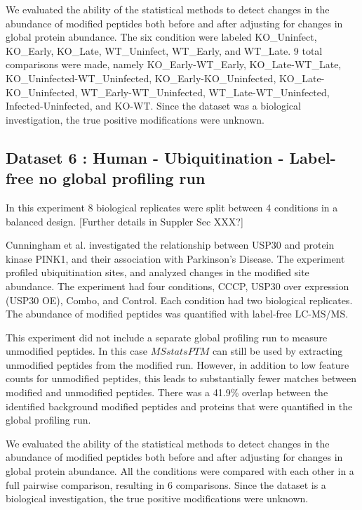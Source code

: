 \documentclass[mcp]{article}
\numberwithin{table}{section}
\def\todo#1{{\color{red}[#1]}}
\begin{document}
\medskip {} We evaluated the ability of the statistical methods to detect changes in the abundance of modified peptides both before and after adjusting for changes in global protein abundance. The six condition were labeled KO\_Uninfect, KO\_Early, KO\_Late, WT\_Uninfect, WT\_Early, and WT\_Late. 9 total comparisons were made, namely KO\_Early-WT\_Early, KO\_Late-WT\_Late, KO\_Uninfected-WT\_Uninfected, KO\_Early-KO\_Uninfected, KO\_Late-KO\_Uninfected, WT\_Early-WT\_Uninfected, WT\_Late-WT\_Uninfected, Infected-Uninfected, and KO-WT. Since the dataset was a biological investigation, the true positive modifications were unknown.


\subsection*{Dataset 6 : Human - Ubiquitination - Label-free no global profiling run}
\label{sec:exp_proc_dataset6}

In this experiment 8 biological replicates were split between 4 conditions in a balanced design. \todo{Further details in Suppler Sec XXX?}
 
\medskip {} Cunningham et al. \cite{Cunningham2015} investigated the relationship between USP30 and protein kinase PINK1, and their association with Parkinson’s Disease. The experiment profiled ubiquitination sites, and analyzed changes in the modified site abundance. The experiment had four conditions, CCCP, USP30 over expression (USP30 OE), Combo, and Control. Each condition had two biological replicates. The abundance of modified peptides was quantified with label-free LC-MS/MS.

\medskip {} This experiment did not include a separate global profiling run to measure unmodified peptides. In this case $MSstatsPTM$ can still be used by extracting unmodified peptides from the modified run. However, in addition to low feature counts for unmodified peptides,  this leads to substantially fewer matches between modified and unmodified peptides. There was a 41.9\% overlap between the identified background modified peptides and proteins that were quantified in the global profiling run.

\medskip {} We evaluated the ability of the statistical methods to detect  changes in the abundance of modified peptides both before and after adjusting for changes in global protein abundance. All the conditions were compared with each other in a full pairwise comparison, resulting in 6 comparisons. Since the dataset is a biological investigation, the true positive modifications were unknown.
\end{document}

